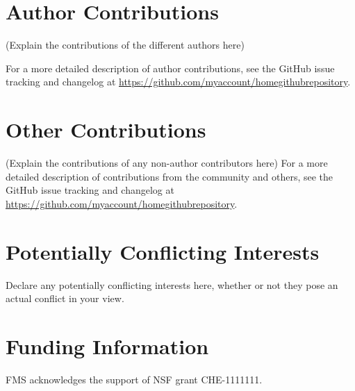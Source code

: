 \documentclass[9pt,bestpractices]{livecoms}
\newcommand{\githubrepository}{\url{https://github.com/myaccount/homegithubrepository}}  %
\begin{document}
\section{Author Contributions}
%

(Explain the contributions of the different authors here)

For a more detailed description of author contributions,
see the GitHub issue tracking and changelog at \githubrepository.

\section{Other Contributions}
%

(Explain the contributions of any non-author contributors here)
For a more detailed description of contributions from the community and others, see the GitHub issue tracking and changelog at \githubrepository.

\section{Potentially Conflicting Interests}

Declare any potentially conflicting interests here, whether or not they pose an actual conflict in your view.

\section{Funding Information}
FMS acknowledges the support of NSF grant CHE-1111111.




\end{document}
